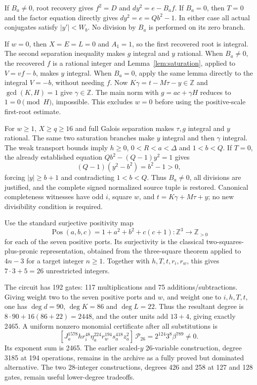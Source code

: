 \documentclass[11pt]{article}
\newcommand{\Z}{\mathbb Z}
\newcommand{\Pos}{\mathbb Z_{>0}}
\begin{document}
If $B_a\ne0$, root recovery gives $f^2=D$ and $dy^2=e-B_af$. If $B_a=0$, then $T=0$ and the factor equation directly gives $dy^2=e=Qb^2-1$. In either case all actual conjugates satisfy $|y'|<W_b$. No division by $B_a$ is performed on its zero branch.

If $w=0$, then $X=E=L=0$ and $A_1=1$, so the first recovered root is integral. The second separation inequality makes $g$ integral and $y$ rational. When $B_a\ne0$, the recovered $f$ is a rational integer and Lemma~\ref{lem:saturation}, applied to $V=vf-b$, makes $y$ integral. When $B_a=0$, apply the same lemma directly to the integral $V=-b$, without needing $f$. Now $K\gamma=t-M\tau-y\in\Z$ and $\gcd(K,H)=1$ give $\gamma\in\Z$. The main norm with $g=ac+\gamma H$ reduces to $1=0\pmod H$, impossible. This excludes $w=0$ before using the positive-scale first-root estimate.

For $w\ge1$, $X\ge q\ge16$ and full Galois separation makes $\tau,g$ integral and $y$ rational. The same two saturation branches make $y$ integral and then $\gamma$ integral. The weak transport bounds imply $h\ge0$, $0<R<a<\Delta$ and $1<b<Q$. If $T=0$, the already established equation $Qb^2-(Q-1)y^2=1$ gives
\[
 (Q-1)(y^2-b^2)=b^2-1>0,
\]
forcing $|y|\ge b+1$ and contradicting $1<b<Q$. Thus $B_a\ne0$, all divisions are justified, and the complete signed normalized source tuple is restored. Canonical completeness witnesses have odd $i$, square $w$, and $t=K\gamma+M\tau+y$; no new divisibility condition is required.

Use the standard surjective positivity map
\[
 \operatorname{Pos}(a,b,c)=1+a^2+b^2+c(c+1):\Z^3\longrightarrow\Pos
\]
for each of the seven positive ports. Its surjectivity is the classical two-squares-plus-pronic representation, obtained from the three-square theorem applied to $4n-3$ for a target integer $n\ge1$. Together with $h,T,t,r_i,r_w$, this gives $7\cdot3+5=26$ unrestricted integers.

The circuit has 192 gates: 117 multiplications and 75 additions/subtractions. Giving weight two to the seven positive ports and $w$, and weight one to $i,h,T,t$, one has $\deg d=90$, $\deg K=86$ and $\deg L=22$. Thus the resultant degree is $8\cdot90+16(86+22)=2448$, and the outer units add $13+4$, giving exactly 2465. A uniform nonzero monomial certificate after all substitutions is
\[
 [J_a^{1578}h r_i^{48}\eta_a^{224}r_w^{194}s_a^{418}z_a^2]\,
 \mathcal P_{26}=2^{124}3^8\beta^{789}\ne0.
\]
Its exponent sum is 2465. The earlier scaled-$y$ 26-variable construction, degree 3185 at 194 operations, remains in the archive as a fully proved but dominated alternative. The two 28-integer constructions, degrees 426 and 258 at 127 and 128 gates, remain useful lower-degree tradeoffs.
\end{document}
